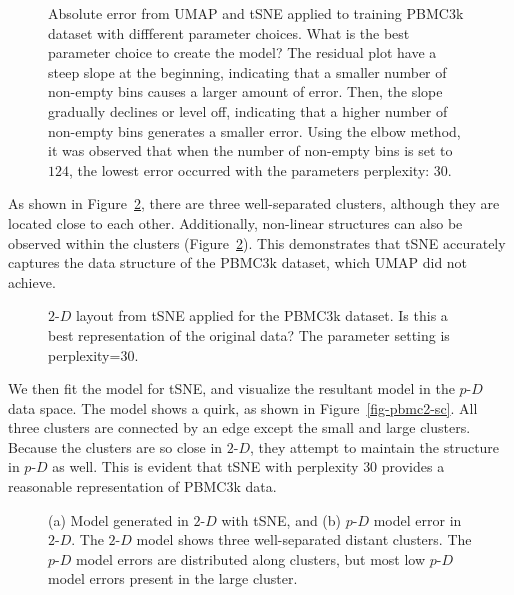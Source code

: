 \documentclass[
  12pt]{article}
\newcommand\pD{$p\text{-}D$}
\newcommand\gD{$2\text{-}D$}
\begin{document}
\begin{figure}[H]


\caption{\label{fig-pbmc-abserror}Absolute error from UMAP and tSNE
applied to training PBMC3k dataset with diffferent parameter choices.
What is the best parameter choice to create the model? The residual plot
have a steep slope at the beginning, indicating that a smaller number of
non-empty bins causes a larger amount of error. Then, the slope
gradually declines or level off, indicating that a higher number of
non-empty bins generates a smaller error. Using the elbow method, it was
observed that when the number of non-empty bins is set to \(124\), the
lowest error occurred with the parameters perplexity: \(30\).}

\end{figure}%

As shown in Figure~\ref{fig-tsne-suggest}, there are three
well-separated clusters, although they are located close to each other.
Additionally, non-linear structures can also be observed within the
clusters (Figure~\ref{fig-tsne-suggest}). This demonstrates that tSNE
accurately captures the data structure of the PBMC3k dataset, which UMAP
did not achieve.

\begin{figure}[H]


\caption{\label{fig-tsne-suggest}\(2\text{-}D\) layout from tSNE applied
for the PBMC3k dataset. Is this a best representation of the original
data? The parameter setting is perplexity=30.}

\end{figure}%

We then fit the model for tSNE, and visualize the resultant model in the
\pD{} data space. The model shows a quirk, as shown in
Figure~\ref{fig-pbmc2-sc}. All three clusters are connected by an edge
except the small and large clusters. Because the clusters are so close
in \gD{}, they attempt to maintain the structure in \pD{} as well. This
is evident that tSNE with perplexity \(30\) provides a reasonable
representation of PBMC3k data.

\begin{figure}[H]


\caption{\label{fig-model-pbmc}(a) Model generated in \(2\text{-}D\)
with tSNE, and (b) \(p\text{-}D\) model error in \(2\text{-}D\). The
\(2\text{-}D\) model shows three well-separated distant clusters. The
\(p\text{-}D\) model errors are distributed along clusters, but most low
\(p\text{-}D\) model errors present in the large cluster.}

\end{figure}%
\end{document}
